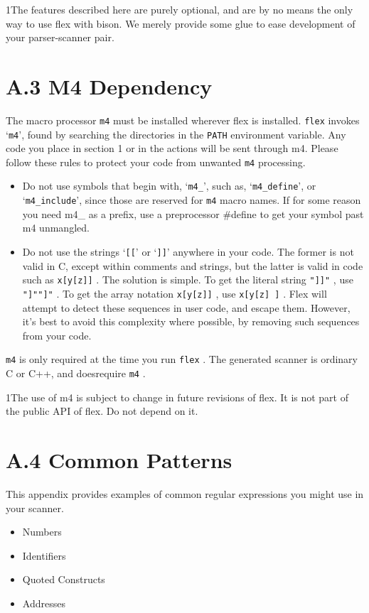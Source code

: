 \documentclass[openany,oneside]{book}
\begin{document}
1The features described here are
purely optional, and are by no means the only way to use flex with bison. 
We merely provide some glue to ease development of your parser-scanner pair.
\section{A.3 M4 Dependency}


The macro processor \verb`m4` must be installed wherever flex is installed. \verb`flex` invokes ‘\verb`m4`’, found by searching the directories in the \verb`PATH` environment variable. Any code you place in section 1 or in the
actions will be sent through m4. Please follow these rules to protect your
code from unwanted \verb`m4` processing.
\begin{itemize}
\item Do not use symbols that begin with, ‘\verb`m4_`’, such as, ‘\verb`m4_define`’,
or ‘\verb`m4_include`’, since those are reserved for \verb`m4` macro names. If for
some reason you need m4\_{} as a prefix, use a preprocessor \#{}define to get your
symbol past m4 unmangled.
\item Do not use the strings ‘\verb`[[`’ or ‘\verb`]]`’ anywhere in your code. The
former is not valid in C, except within comments and strings, but the latter is valid in
code such as \verb`x[y[z]]` . The solution is simple. To get the literal string \verb`"]]"` , use \verb`"]""]"` . To get the array notation \verb`x[y[z]]` ,
use \verb`x[y[z] ]` . Flex will attempt to detect these sequences in user code, and
escape them. However, it's best to avoid this complexity where possible, by
removing such sequences from your code.
\end{itemize}


 \verb`m4` is only required at the time you run \verb`flex` . The generated
scanner is ordinary C or C++, and doesrequire \verb`m4` .

1The use of m4 is subject to change in
future revisions of flex. It is not part of the public API of flex. Do not depend on it.
\section{A.4 Common Patterns}


This appendix provides examples of common regular expressions you might use
in your scanner.
\begin{itemize}
\item Numbers
\item Identifiers
\item Quoted Constructs
\item Addresses
\end{itemize}
\end{document}
